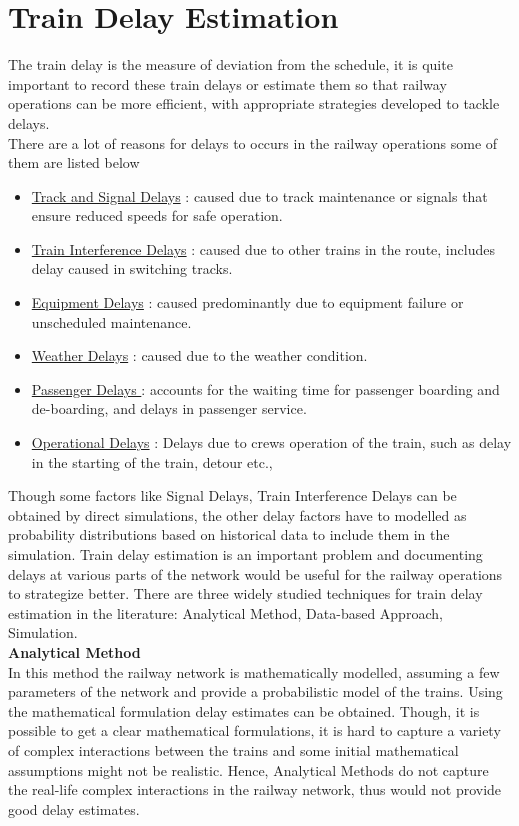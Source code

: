 \documentclass[twoside,11pt]{article}
\begin{document}
\newpage
 
\section{Train Delay Estimation}

The train delay is the measure of deviation from the schedule, it is quite 
important to record these train delays or estimate them so that railway operations 
can be more efficient, with appropriate strategies developed to tackle delays. \\

There are a lot of reasons for delays to occurs in the railway operations some of them
are listed below 
\begin{itemize}
	\item \underline{ Track and Signal Delays} : caused due to track maintenance or signals that ensure reduced speeds for safe operation.
	\item \underline{ Train Interference Delays} : caused due to other trains in the
	route, includes delay caused in switching tracks. 
	\item \underline{ Equipment Delays} : caused predominantly due to equipment failure or unscheduled maintenance.
	\item \underline{ Weather Delays} : caused due to the weather condition.
	\item \underline{ Passenger Delays } : accounts for the waiting time for passenger boarding and de-boarding, and delays in passenger service.
	\item \underline{ Operational Delays} : Delays due to crews operation of the train, such as delay in the starting of the train, detour etc.,
\end{itemize}

Though some factors like Signal Delays, Train Interference Delays can be obtained by direct simulations, the other delay factors have to modelled as
probability distributions based on historical data to include them in the simulation. Train delay estimation is an important problem and documenting delays at various parts of the network would be useful for the railway operations to strategize better. There are three widely studied techniques for train delay estimation in the literature: Analytical Method, Data-based Approach, Simulation. \\

{\noindent \bf Analytical Method }  \\

In this method the railway network is mathematically modelled, assuming
a few parameters of the network and provide a probabilistic model of the trains.
Using the mathematical formulation delay estimates can be obtained. Though,
it is possible to get a clear mathematical formulations, it is hard to capture a variety of complex
interactions between the trains and some initial mathematical assumptions might
not be realistic. Hence, Analytical Methods do not capture the real-life complex
interactions in the railway network, thus would not provide good delay estimates.  \\
\end{document}
